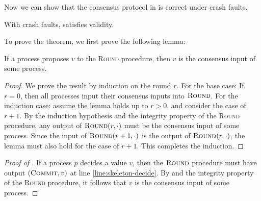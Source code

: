 Now we can show that the consensus protocol in  is correct under crash faults.

\begin{theorem}\label{thm:validity-crash}
    With crash faults,  satisfies validity.
\end{theorem}

To prove the theorem, we first prove the following lemma:
\begin{lemma}\label{lem:crash-validity}
    If a process proposes $v$ to the \textsc{Round} procedure, then $v$ is the consensus input of some process.
\end{lemma}
\begin{proof}
    We prove the result by induction on the round $r$. For the base case: If $r = 0$, then all processes input their consensus inputs into $\textsc{Round}$. For the induction case: assume the lemma holds up to $r > 0$, and consider the case of $r + 1$. By the induction hypothesis and the integrity property of the \textsc{Round} procedure, any output of $\textsc{Round}(r,\cdot)$ must be the consensus input of some process. Since the input of $\textsc{Round}(r+1,\cdot)$ is the output of $\textsc{Round}(r,\cdot)$, the lemma must also hold for the case of $r+1$. This completes the induction.
\end{proof}

\begin{proof}[Proof of ]
     If a process $p$ decides a value $v$, then the $\textsc{Round}$ procedure must have output $(\textsc{Commit}, v)$ at line \ref{line:skeleton-decide}. By  and the integrity property of the \textsc{Round} procedure, it follows that $v$ is the consensus input of some process.
\end{proof}

